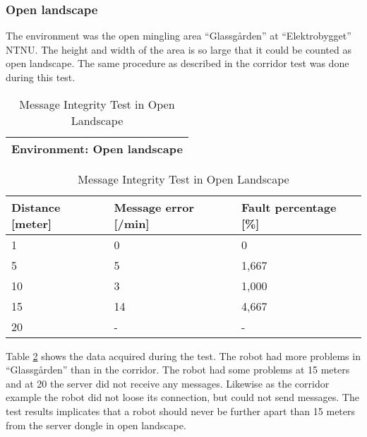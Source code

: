 \newpage
\subsubsection{Open landscape}
The environment was the open mingling area ``Glassgården'' at ``Elektrobygget'' NTNU. The height and width of the area is so large that it could be counted as open landscape.
The same procedure as described in the corridor test was done during this test.

\begin{table}[ht]
\begin{center}
 \begin{tabular}{|p{130pt}|} 
 \hline
 Environment: \textbf{Open landscape}\\
 \hline
 \end{tabular}
 \begin{tabular}{|p{90pt}|p{100pt}|p{90pt}|}
 \hline
 Distance [meter] & Message error [/min] &  Fault percentage [\%]\\
 \hline
 1		        &   0 		&	0    \\
 5              &   5  		&	1,667\\
 10             &   3  		&	1,000\\
 15				&	14 		&	4,667\\
 20				&	-  		&	-	\\
 \hline
\end{tabular}
\end{center}
\caption{Message Integrity Test in Open Landscape}
\label{tab:messintegrityopen}
\end{table}

Table \ref{tab:messintegrityopen} shows the data acquired during the test. The robot had more problems in ``Glassgården'' than in the corridor. The robot had some problems at 15 meters and at 20 the server did not receive any messages. Likewise as the corridor example the robot did not loose its connection, but could not send messages. The test results implicates that a robot should never be further apart than 15 meters from the server dongle in open landscape.